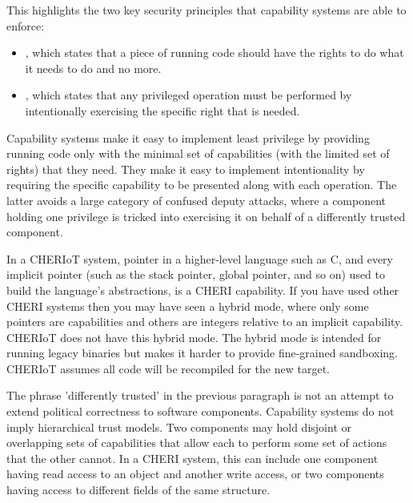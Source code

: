 
This highlights the two key security principles that capability systems are able to enforce:

\begin{itemize}
	\item{, which states that a piece of running code should have the rights to do what it needs to do and no more.}
	\item{, which states that any privileged operation must be performed by intentionally exercising the specific right that is needed.}
\end{itemize}

Capability systems make it easy to implement least privilege by providing running code only with the minimal set of capabilities (with the limited set of rights) that they need.
They make it easy to implement intentionality by requiring the specific capability to be presented along with each operation.
The latter avoids a large category of confused deputy attacks, where a component holding one privilege is tricked into exercising it on behalf of a differently trusted component.

\begin{note}
	In a CHERIoT system,  pointer in a higher-level language such as C, and every implicit pointer (such as the stack pointer, global pointer, and so on) used to build the language's abstractions, is a CHERI capability.
	If you have used other CHERI systems then you may have seen a hybrid mode, where only some pointers are capabilities and others are integers relative to an implicit capability.
	CHERIoT does not have this hybrid mode.
	The hybrid mode is intended for running legacy binaries but makes it harder to provide fine-grained sandboxing.
	CHERIoT assumes all code will be recompiled for the new target.
\end{note}

The phrase 'differently trusted' in the previous paragraph is not an attempt to extend political correctness to software components.
Capability systems do not imply hierarchical trust models.
Two components may hold disjoint or overlapping sets of capabilities that allow each to perform some set of actions that the other cannot.
In a CHERI system, this can include one component having read access to an object and another write access, or two components having access to different fields of the same structure.


